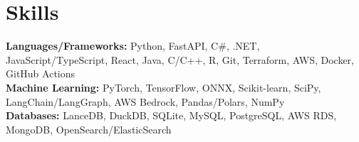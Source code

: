 \section{Skills}
 \begin{itemize}[leftmargin=0.15in, label={}]
    \small{\item{
     \textbf{Languages/Frameworks: }{Python, FastAPI, C\#, .NET, JavaScript/TypeScript, React, Java, C/C++, R, Git, Terraform, AWS, Docker, GitHub Actions} \\
     \textbf{Machine Learning: }{PyTorch, TensorFlow, ONNX, Scikit-learn, SciPy, LangChain/LangGraph, AWS Bedrock, Pandas/Polars, NumPy} \\
     \textbf{Databases: }{LanceDB, DuckDB, SQLite, MySQL, PostgreSQL, AWS RDS, MongoDB, OpenSearch/ElasticSearch}
    }}
 \end{itemize}
